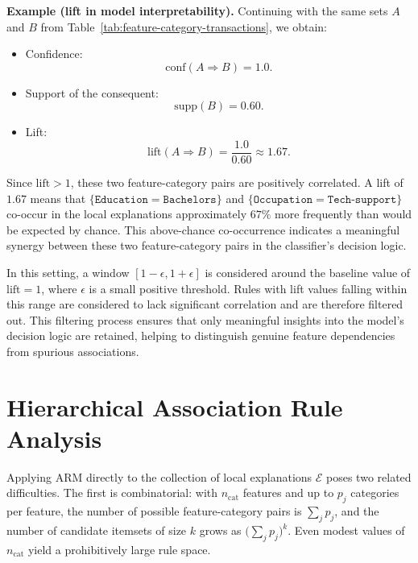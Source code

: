 \noindent\textbf{Example (lift in model interpretability).} Continuing with the same sets $A$ and $B$ from Table~\ref{tab:feature-category-transactions}, we obtain:

\begin{itemize}
  \item Confidence: \[\mathrm{conf}(A \Rightarrow B) = 1.0.\]
  \item Support of the consequent: \[\mathrm{supp}(B) = 0.60.\]
  \item Lift: \[\mathrm{lift}(A \Rightarrow B) = \frac{1.0}{0.60} \approx 1.67.\]
\end{itemize}

Since $\mathrm{lift} > 1$, these two feature-category pairs are positively correlated. A lift of $1.67$ means that $\{\texttt{Education}=\texttt{Bachelors}\}$ and $\{\texttt{Occupation}=\texttt{Tech-support}\}$ co-occur in the local explanations approximately $67\%$ more frequently than would be expected by chance. This above-chance co-occurrence indicates a meaningful synergy between these two feature-category pairs in the classifier's decision logic.

In this setting, a window $[1 - \epsilon, 1 + \epsilon]$ is considered around the baseline value of $\mathrm{lift}=1$, where $\epsilon$ is a small positive threshold. Rules with lift values falling within this range are considered to lack significant correlation and are therefore filtered out. This filtering process ensures that only meaningful insights into the model's decision logic are retained, helping to distinguish genuine feature dependencies from spurious associations.

\section{Hierarchical Association Rule Analysis}

Applying ARM directly to the collection of local explanations $\mathcal{E}$ poses two related difficulties. The first is combinatorial: with $n_{\mathrm{cat}}$ features and up to $p_j$ categories per feature, the number of possible feature-category pairs is $\sum_j p_j$, and the number of candidate itemsets of size $k$ grows as $\bigl(\sum_j p_j\bigr)^k$. Even modest values of $n_{\mathrm{cat}}$ yield a prohibitively large rule space.

